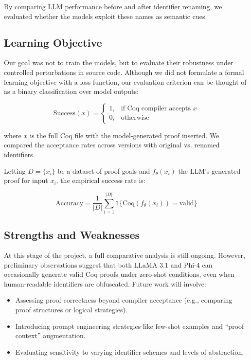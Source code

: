 By comparing LLM performance before and after identifier renaming, we evaluated whether the models exploit these names as semantic cues.

\subsection{Learning Objective}

Our goal was not to train the models, but to evaluate their robustness under controlled perturbations in source code. Although we did not formulate a formal learning objective with a loss function, our evaluation criterion can be thought of as a binary classification over model outputs:

\[
\text{Success}(x) =
\begin{cases}
1, & \text{if Coq compiler accepts } x \\
0, & \text{otherwise}
\end{cases}
\]

where \( x \) is the full Coq file with the model-generated proof inserted. We compared the acceptance rates across versions with original vs. renamed identifiers.

Letting \( D = \{x_i\} \) be a dataset of proof goals and \( f_\theta(x_i) \) the LLM's generated proof for input \( x_i \), the empirical success rate is:

\[
\text{Accuracy} = \frac{1}{|D|} \sum_{i=1}^{|D|} \mathbb{1}\{ \text{Coq}(f_\theta(x_i)) = \text{valid} \}
\]

\subsection{Strengths and Weaknesses}
At this stage of the project, a full comparative analysis is still ongoing. However, preliminary observations suggest that both LLaMA 3.1 and Phi-4 can occasionally generate valid Coq proofs under zero-shot conditions, even when human-readable identifiers are obfuscated. Future work will involve:

\begin{itemize}
  \item Assessing proof correctness beyond compiler acceptance (e.g., comparing proof structures or logical strategies).
  \item Introducing prompt engineering strategies like few-shot examples and ``proof context'' augmentation.
  \item Evaluating sensitivity to varying identifier schemes and levels of abstraction.
\end{itemize}
